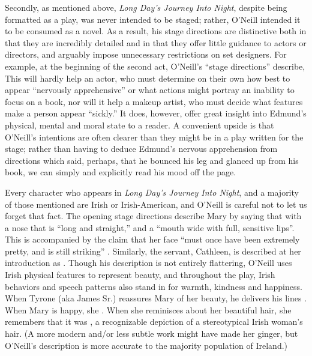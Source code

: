 \documentclass[letterpaper, 12pt]{article}
\newcommand{\ldjin}{\textit{Long Day's Journey Into Night}}
\newcommand{\oneill}{O'Neill}
\begin{document}
Secondly, as mentioned above, \ldjin{}, despite being formatted as a play, was
never intended to be staged; rather, \oneill{} intended it to be consumed as a
novel. As a result, his stage directions are distinctive both in that they are
incredibly detailed and in that they offer little guidance to actors or
directors, and arguably impose unnecessary restrictions on set designers. For
example, at the beginning of the second act, \oneill{}'s \enquote{stage
  directions} describe,  This will hardly help an actor, who must determine on
their own how best to appear \enquote{nervously apprehensive} or what actions
might portray an inability to focus on a book, nor will it help a makeup
artist, who must decide what features make a person appear \enquote{sickly.} It
does, however, offer great insight into Edmund's physical, mental and moral
state to a reader. A convenient upside is that \oneill{}'s intentions are often
clearer than they might be in a play written for the stage; rather than having
to deduce Edmund's nervous apprehension from directions which said, perhaps,
that he bounced his leg and glanced up from his book, we can simply and
explicitly read his mood off the page.

Every character who appears in \ldjin{}, and a majority of those mentioned are
Irish or Irish-American, and \oneill{} is careful not to let us forget that
fact. The opening stage directions describe Mary by saying that  with a nose that is \enquote{long and
  straight,} and a \enquote{mouth wide with full, sensitive lips}. This is
accompanied by the claim that her face \enquote{must once have been extremely
  pretty, and is still striking} \parencite[loc. 127]{ldjin}. Similarly, the
servant, Cathleen, is described at her introduction as
. Though
his description is not entirely flattering, \oneill{} uses Irish physical
features to represent beauty, and throughout the play, Irish behaviors and
speech patterns also stand in for warmth, kindness and happiness. When Tyrone
(aka James Sr.) reassures Mary of her beauty, he delivers his lines
. When Mary is
happy, she . When she reminisces about her beautiful hair,
she remembers that it was , a
recognizable depiction of a stereotypical Irish woman's hair. (A more modern
and/or less subtle work might have made her ginger, but \oneill{}'s description
is more accurate to the majority population of Ireland.)
\end{document}
